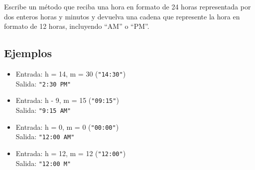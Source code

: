 Escribe un método que reciba una hora en formato de 24 horas representada por dos enteros horas y minutos y devuelva una cadena que represente la hora en formato de 12 horas, incluyendo ``AM'' o ``PM''.
\subsection*{Ejemplos}
\begin{itemize}
    \item Entrada: h = 14, m = 30 (\texttt{"14:30"})\\
          Salida: \texttt{"2:30 PM"}
    \item Entrada: h - 9, m = 15 (\texttt{"09:15"})\\
          Salida: \texttt{"9:15 AM"}
    \item Entrada: h = 0, m = 0 (\texttt{"00:00"})\\
          Salida: \texttt{"12:00 AM"}
    \item Entrada: h = 12, m = 12 (\texttt{"12:00"})\\
          Salida: \texttt{"12:00 M"}
\end{itemize}